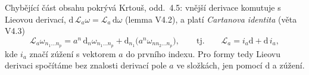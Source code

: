 
\begin{vysvetleni}
Chybějící část obsahu pokrývá Krtouš, odd.~4.5: vnější derivace komutuje s Lieovou derivací, $\mathrm{d}\,\mathcal{L}_a\omega=\mathcal{L}_a\,\mathrm{d}\omega$ (lemma V4.2), a platí \emph{Cartanova identita} (věta V4.3)
\[
  \mathcal{L}_a\omega_{n_1\dots n_p}=a^n\,\mathrm{d}_n\omega_{n_1\dots n_p}+\mathrm{d}_{n_1}\big(a^n\omega_{n n_2\dots n_p}\big),
  \qquad\text{tj.}\qquad \mathcal{L}_a=i_a\mathrm{d}+\mathrm{d}\,i_a ,
\]
kde $i_a$ značí zúžení s vektorem $a$ do prvního indexu. Pro formy tedy Lieovu derivaci spočítáme bez znalosti derivací pole $a$ ve složkách, jen pomocí $\mathrm{d}$ a zúžení.
\end{vysvetleni}

